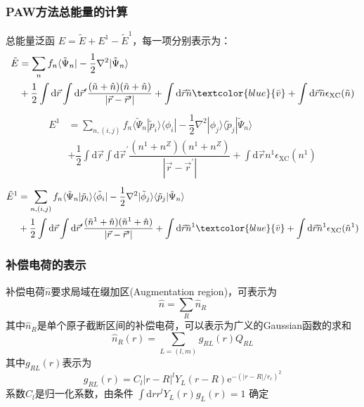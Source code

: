 {\frame
{
\frametitle{\textrm{PAW}方法总能量的计算}
总能量泛函
$E=\tilde E+E^1-\tilde E^1$，每一项分别表示为：
\begin{displaymath}
	\begin{aligned}
		\tilde E&=\sum_nf_n\langle\tilde\Psi_n|-\dfrac12\nabla^2|\tilde\Psi_n\rangle\\
		&+\dfrac12\int\mathrm{d}\vec r\int\mathrm{d}\vec r^{\prime}\dfrac{(\tilde n+\hat n)(\tilde n+\hat n)}{|\vec r-\vec r^{\prime}|}+\int\mathrm{d}\vec r \tilde n\textcolor{blue}{\bar v}+\int\mathrm{d}\vec r \tilde n\epsilon_{\mathrm{XC}}(\tilde n)
 	\end{aligned}
\end{displaymath}
\begin{displaymath}
	\begin{aligned}
		E^1&=\sum_{n,(i,j)}f_n\langle\tilde\Psi_n|\tilde p_i\rangle\langle\phi_i|-\dfrac12\nabla^2|\phi_j\rangle\langle\tilde p_j|\tilde\Psi_n\rangle\\
		 &+\dfrac12\int\mathrm{d}\vec r\int\mathrm{d}\vec r^{\prime}\dfrac{(n^1+n^Z)(n^1+n^Z)}{|\vec r-\vec r^{\prime}|}+\int\mathrm{d}\vec r n^1\epsilon_{\mathrm{XC}}(n^1)
 	\end{aligned}
\end{displaymath}
\begin{displaymath}
	\begin{aligned}
		\tilde E^1&=\sum_{n,(i,j)}f_n\langle\tilde\Psi_n|\tilde p_i\rangle\langle\tilde\phi_i|-\dfrac12\nabla^2|\tilde\phi_j\rangle\langle\tilde p_j|\tilde\Psi_n\rangle\\
		&+\dfrac12\int\mathrm{d}\vec r\int\mathrm{d}\vec r^{\prime}\dfrac{(\tilde n^1+\hat n)(\tilde n^1+\hat n)}{|\vec r-\vec r^{\prime}|}+\int\mathrm{d}\vec r \tilde n^1\textcolor{blue}{\bar v}+\int\mathrm{d}\vec r \tilde n^1\epsilon_{\mathrm{XC}}(\tilde n^1)
 	\end{aligned}
\end{displaymath}
}

\frame
{
	\frametitle{补偿电荷的表示}
	补偿电荷$\hat n$要求局域在缀加区(\textrm{Augmentation region})，可表示为
	$$\hat n=\sum_R\hat n_R$$
	其中$\hat n_R$是单个原子截断区间的补偿电荷，可以表示为广义的\textrm{Gaussian}函数的求和
	$$\hat n_R(r)=\sum_{L=(l,m)}g_{RL}(r)Q_{RL}$$
	其中$g_{RL}(r)$表示为
	$$g_{RL}(r)=C_l|r-R|^lY_L(r-R)\mathrm{e}^{-(|r-R|/r_c)^2}$$
	系数$C_l$是归一化系数，由条件
	$\int\mathrm{d}rr^lY_L(r)g_L(r)=1$
	确定

}}
